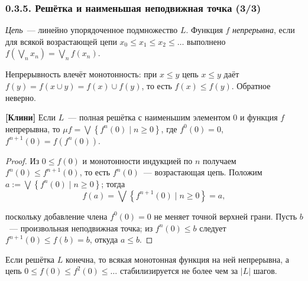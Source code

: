 \documentclass[mathserif,12pt,aspectratio=169]{beamer}
\def\emразделенной{\em разделенной}
\renewcommand{\index}[1]{}
\def\em#1{\it\color{blue}#1}
\def\NB#1{{\bf\color{brown}#1}}
\def\odmkey#1#2{{\it\color{red} #1}\index{#2}}
\def\Set#1#2{\left\{ #1 \mid #2 \right\}}
\def\Assign{\operatorname{:=}}
\let\le\leqslant
\begin{document}
\begin{frame}
\frametitle{0.3.5. Решётка и наименьшая неподвижная точка (3/3)}

{\em Цепь}~--- линейно упорядоченное подмножество $L$. Функция $f$
\odmkey{непрерывна}{Функция!непрерывная}, если для всякой возрастающей цепи
$x_0\le x_1\le x_2\le\dots$ выполнено
$f\left(\bigvee_n x_n\right)=\bigvee_n f(x_n)$.

\begin{remark}
Непрерывность влечёт монотонность: при $x\le y$ цепь $x\le y$ даёт
$f(y)=f(x\cup y)=f(x)\cup f(y)$, то есть $f(x)\le f(y)$. Обратное неверно.
\end{remark}

\begin{theorem} \NB{[Клини]}
Если $L$~--- полная решётка с наименьшим элементом $0$ и функция $f$ непрерывна,
то $\mu f=\bigvee\Set{f^n(0)}{n\geqslant 0}$, где $f^0(0)=0$,
$f^{n+1}(0)=f(f^n(0))$.
\end{theorem}
\vspace{-4pt}

\begin{proof}
Из $0\le f(0)$ и монотонности индукцией по $n$ получаем $f^n(0)\le f^{n+1}(0)$,
то есть $f^n(0)$~--- возрастающая цепь. Положим
$a\Assign\bigvee\Set{f^n(0)}{n\geqslant 0}$; тогда
\vspace{-6pt}
$$f(a)=\bigvee\Set{f^{n+1}(0)}{n\geqslant 0}=a,$$
\vspace{-18pt}

поскольку добавление члена $f^0(0)=0$ не меняет точной верхней грани. Пусть
$b$~--- произвольная неподвижная точка; из $f^n(0)\le b$ следует
$f^{n+1}(0)\le f(b)=b$, откуда $a\le b$.
\end{proof}
\vspace{-4pt}
\begin{corollary}
Если решётка $L$ конечна, то всякая монотонная функция на ней непрерывна, а цепь
$0\le f(0)\le f^2(0)\le\dots$ стабилизируется не более чем за $|L|$ шагов.
\end{corollary}
\end{frame}


\end{document}
